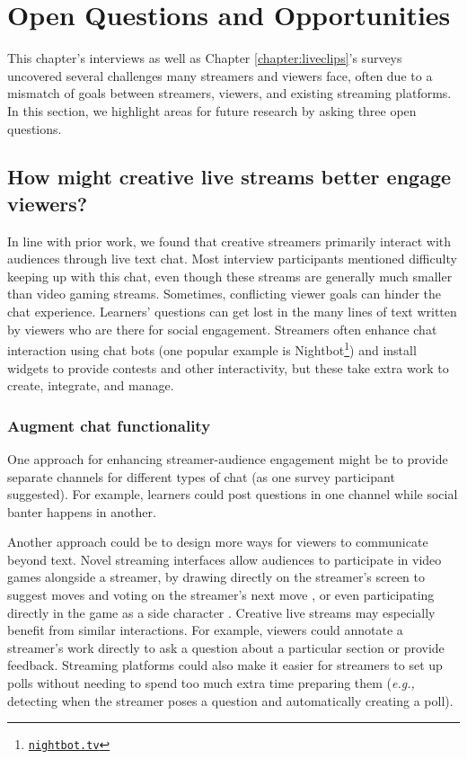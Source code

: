 \section{Open Questions and Opportunities}
This chapter's interviews as well as Chapter \ref{chapter:liveclips}'s surveys uncovered several challenges many streamers and viewers face, often due to a mismatch of goals between streamers, viewers, and existing streaming platforms. In this section, we highlight areas for future research by asking three open questions.

\subsection{How might creative live streams better engage viewers?}
In line with prior work, we found that creative streamers primarily interact with audiences through live text chat. Most interview participants mentioned difficulty keeping up with this chat, even though these streams are generally much smaller than video gaming streams. Sometimes, conflicting viewer goals can hinder the chat experience. Learners' questions can get lost in the many lines of text written by viewers who are there for social engagement. 
Streamers often enhance chat interaction using chat bots (one popular example is Nightbot\footnote{\href{https://nightbot.tv/}{\nolinkurl{nightbot.tv}}}) and install widgets to provide contests and other interactivity, but these take extra work to create, integrate, and manage.

\subsubsection{Augment chat functionality}
One approach for enhancing streamer-audience engagement might be to provide separate channels for different types of chat (as one survey participant suggested). For example, learners could post questions in one channel while social banter happens in another.

Another approach could be to design more ways for viewers to communicate beyond text. Novel streaming interfaces allow audiences to participate in video games alongside a streamer, by drawing directly on the streamer's screen to suggest moves and voting on the streamer's next move \cite{Lessel2017}, or even participating directly in the game as a side character \cite{Glickman2018}. Creative live streams may especially benefit from similar interactions. For example, viewers could annotate a streamer's work directly to ask a question about a particular section or provide feedback. Streaming platforms could also make it easier for streamers to set up polls without needing to spend too much extra time preparing them (\textit{e.g.,} detecting when the streamer poses a question and automatically creating a poll).

